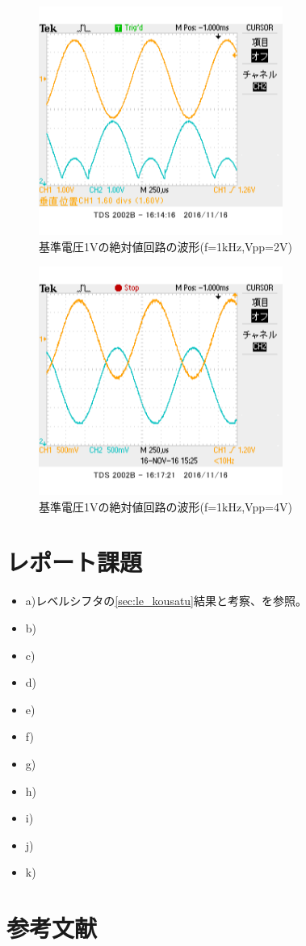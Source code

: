 \documentclass[11pt,a4j]{jsarticle}
\begin{document}
  \begin{figure}[htbp]
  \centering
  \includegraphics[width=8cm,clip]{2_abs_Vr1_f1V2sin_ViVo.png}
  \caption{基準電圧1Vの絶対値回路の波形(f=1kHz,Vpp=2V)}
  \label{fig:2_Vr1_2}
 \end{figure}%
  
  
  \begin{figure}[htbp]
  \centering
  \includegraphics[width=8cm,clip]{2_abs_Vr1_f1V4sin_ViVo.png}
  \caption{基準電圧1Vの絶対値回路の波形(f=1kHz,Vpp=4V)}
  \label{fig:2_Vr1_4}
 \end{figure}%
  
  
  \clearpage
  
 \section{レポート課題} 
  \begin{itemize}
  \item a)レベルシフタの\ref{sec:le_kousatu}結果と考察、を参照。
  \item b)
  \item c)
  \item d)
  \item e)
  \item f)
  \item g)
  \item h)
  \item i)
  \item j)
  \item k)
  \end{itemize}
  
 \section{参考文献}
  
  
  
\end{document}
